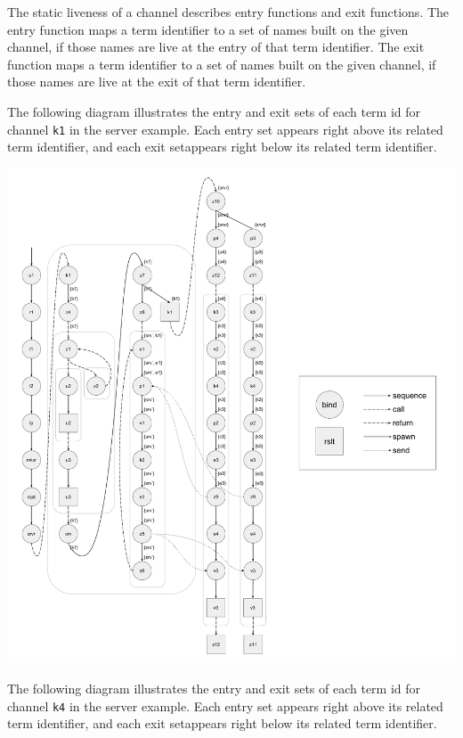 \documentclass[letterpaper, 11pt]{extarticle}
\begin{document}
The static liveness of a channel describes entry functions and exit functions.
The entry function maps a term identifier to a set of names built on
the given channel, if those names are live at the entry of that term identifier.
The exit function maps a term identifier to a
set of names built on the given channel, if those names are live at the exit of that
term identifier.

The following diagram illustrates the entry and exit sets of each term id
for channel \lstinline{k1} in
the server example.  Each entry set appears right above its related term identifier,
and each exit setappears right below its related term identifier. 

\includegraphics[width=1\textwidth]{cml-liveness-analysis-k1.pdf}

The following diagram illustrates the entry and exit sets of each term id
for channel \lstinline{k4} in
the server example.  Each entry set appears right above its related term identifier,
and each exit setappears right below its related term identifier. 
\end{document}
